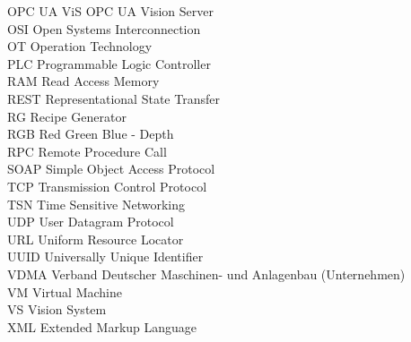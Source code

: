 \begin{tabbing}
OPC UA ViS    \>  OPC UA Vision Server\\
OSI     \>  Open Systems Interconnection\\
OT  \> Operation Technology\\
PLC  \> Programmable Logic Controller\\
RAM    \> Read Access Memory \\
REST    \> Representational State Transfer \\
RG    \> Recipe Generator \\
RGB    \> Red Green Blue - Depth \\
RPC    \> Remote Procedure Call \\
SOAP	 \> 	Simple Object Access Protocol	 \\
TCP	 \> 	Transmission Control Protocol	 \\
TSN	 \> 	Time Sensitive Networking	 \\
UDP	 \> 	User Datagram Protocol	 \\
URL	 \> 	Uniform Resource Locator	 \\
UUID	 \> 	Universally Unique Identifier	 \\
VDMA \>     Verband Deutscher Maschinen- und Anlagenbau (Unternehmen) \\
VM	 \> 	Virtual Machine	 \\
VS  \>  Vision System\\
XML  \>  Extended Markup Language\\
\end{tabbing}

